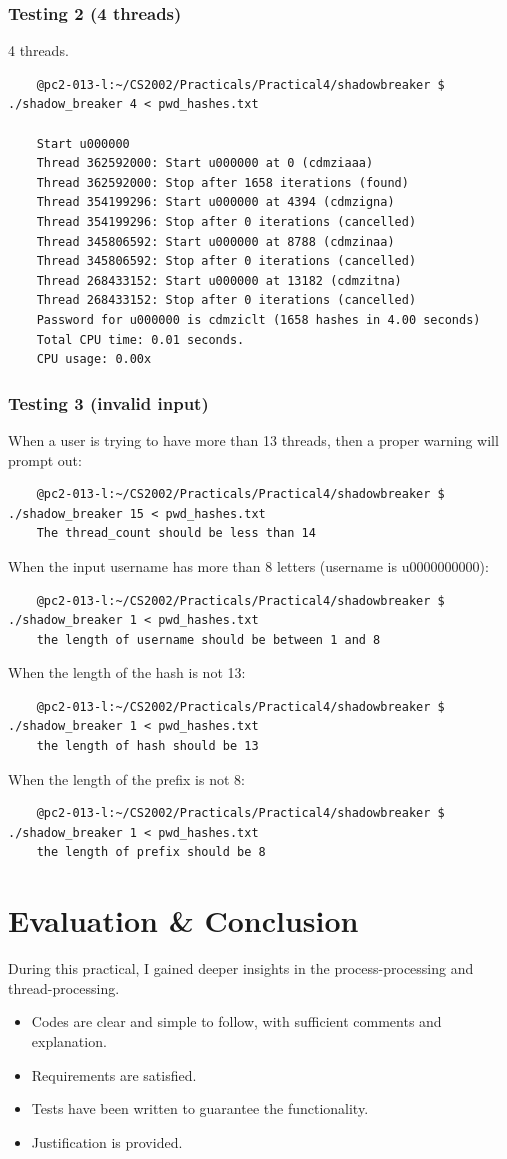 \documentclass{article}
\begin{document}
\subsubsection{Testing 2 (4 threads)}
4 threads.
\begin{lstlisting}
	@pc2-013-l:~/CS2002/Practicals/Practical4/shadowbreaker $ ./shadow_breaker 4 < pwd_hashes.txt

	Start u000000
	Thread 362592000: Start u000000 at 0 (cdmziaaa)
	Thread 362592000: Stop after 1658 iterations (found)
	Thread 354199296: Start u000000 at 4394 (cdmzigna)
	Thread 354199296: Stop after 0 iterations (cancelled)
	Thread 345806592: Start u000000 at 8788 (cdmzinaa)
	Thread 345806592: Stop after 0 iterations (cancelled)
	Thread 268433152: Start u000000 at 13182 (cdmzitna)
	Thread 268433152: Stop after 0 iterations (cancelled)
	Password for u000000 is cdmziclt (1658 hashes in 4.00 seconds)
	Total CPU time: 0.01 seconds.
	CPU usage: 0.00x
\end{lstlisting}

\subsubsection{Testing 3 (invalid input)}

When a user is trying to have more than 13 threads, then a proper warning will prompt out: 
\begin{lstlisting}
	@pc2-013-l:~/CS2002/Practicals/Practical4/shadowbreaker $ ./shadow_breaker 15 < pwd_hashes.txt
	The thread_count should be less than 14 
\end{lstlisting}

When the input username has more than 8 letters (username is u0000000000): 
\begin{lstlisting}
	@pc2-013-l:~/CS2002/Practicals/Practical4/shadowbreaker $ ./shadow_breaker 1 < pwd_hashes.txt
	the length of username should be between 1 and 8 
\end{lstlisting}
When the length of the hash is not 13:
\begin{lstlisting}
	@pc2-013-l:~/CS2002/Practicals/Practical4/shadowbreaker $ ./shadow_breaker 1 < pwd_hashes.txt
	the length of hash should be 13 
\end{lstlisting}
When the length of the prefix is not 8:
\begin{lstlisting}
	@pc2-013-l:~/CS2002/Practicals/Practical4/shadowbreaker $ ./shadow_breaker 1 < pwd_hashes.txt
	the length of prefix should be 8
\end{lstlisting}
\section{Evaluation \& Conclusion}
During this practical, I gained deeper insights in the process-processing and thread-processing. 
\begin{itemize}
	\item Codes are clear and simple to follow, with sufficient comments and explanation.
	\item Requirements are satisfied.
	\item Tests have been written to guarantee the functionality.
	\item Justification is provided.
\end{itemize}
\end{document}
